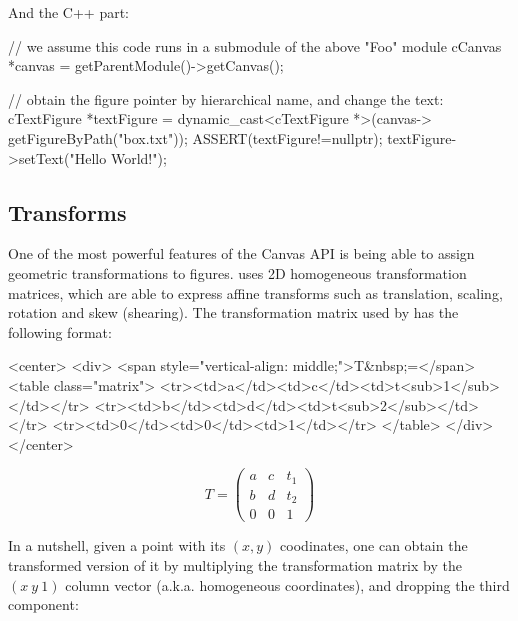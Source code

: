And the C++ part:

\begin{cpp}
// we assume this code runs in a submodule of the above "Foo" module
cCanvas *canvas = getParentModule()->getCanvas();

// obtain the figure pointer by hierarchical name, and change the text:
cTextFigure *textFigure = dynamic_cast<cTextFigure *>(canvas->
                                          getFigureByPath("box.txt"));
ASSERT(textFigure!=nullptr);
textFigure->setText("Hello World!");
\end{cpp}




\subsection{Transforms}
\label{sec:graphics:canvas-transforms}

One of the most powerful features of the Canvas API is being able to assign
geometric transformations to figures. {\opp} uses 2D homogeneous
transformation matrices, which are able to express affine transforms such
as translation, scaling, rotation and skew (shearing). The
transformation matrix used by {\opp} has the following format:

\begin{htmlonly}
<center>
<div>
<span style="vertical-align: middle;">T&nbsp;=</span>
<table class="matrix">
  <tr><td>a</td><td>c</td><td>t<sub>1</sub></td></tr>
  <tr><td>b</td><td>d</td><td>t<sub>2</sub></td></tr>
  <tr><td>0</td><td>0</td><td>1</td></tr>
</table>
</div>
</center>
\end{htmlonly}

\begin{pdfonly}
\[ T = \left( \begin{array}{ccc}
a & c & t_1 \\
b & d & t_2 \\
0 & 0 & 1 \end{array} \right)\]
\end{pdfonly}

In a nutshell, given a point with its $(x, y)$ coodinates, one can obtain the
transformed version of it by multiplying the transformation matrix by the
$(x \ y \ 1)$ column vector (a.k.a. homogeneous coordinates), and dropping the
third component:

